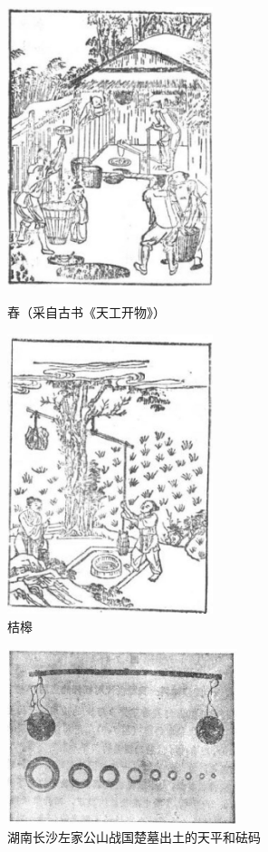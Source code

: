 \begin{figure}[htbp]
    \centering
    \begin{minipage}{7cm}
    \centering
    \includegraphics[width=6cm]{../pic/czwl1-ch7-9}
    \caption{舂（采自古书《天工开物》）}\label{fig:7-9}
    \end{minipage}
    \qquad
    \begin{minipage}{7cm}
    \centering
    \includegraphics[width=6cm]{../pic/czwl1-ch7-10}
    \caption{桔槔}\label{fig:7-10}
    \end{minipage}
\end{figure}

\begin{figure}[htbp]
    \centering
    \includegraphics[width=0.6\textwidth]{../pic/czwl1-ch7-11}
    \caption{湖南长沙左家公山战国楚墓出土的天平和砝码}\label{fig:7-11}
\end{figure}


